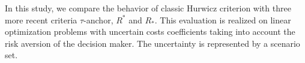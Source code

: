 
In this study, we compare the behavior of classic Hurwicz criterion with three more recent criteria $\tau$-anchor, $R^*$ and $R_*$. 
This evaluation is realized on linear optimization problems with uncertain costs coefficients taking into account the risk aversion of the decision maker. The uncertainty is represented by a scenario set. 

